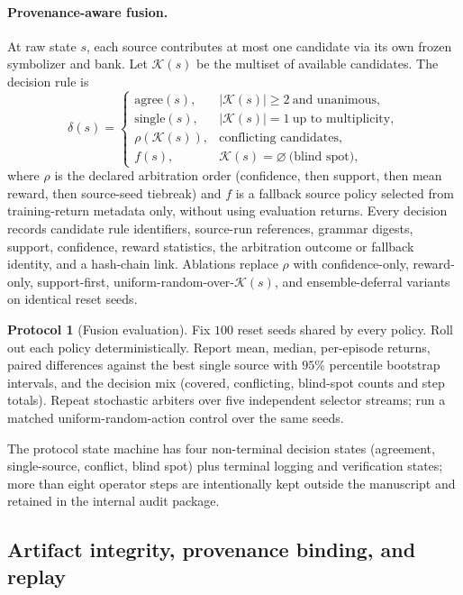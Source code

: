 \documentclass[11pt,a4paper]{article}
\theoremstyle{definition}
\newtheorem{protocol}{Protocol}[section]
\begin{document}
\paragraph{Provenance-aware fusion.}
At raw state $s$, each source contributes at most one candidate via its own
frozen symbolizer and bank. Let $\mathcal{K}(s)$ be the multiset of available
candidates. The decision rule is
\begin{equation}
\delta(s) =
\begin{cases}
\text{agree}(s), & |\mathcal{K}(s)| \ge 2\ \text{and unanimous},\\
\text{single}(s), & |\mathcal{K}(s)| = 1\ \text{up to multiplicity},\\
\rho(\mathcal{K}(s)), & \text{conflicting candidates},\\
f(s), & \mathcal{K}(s) = \varnothing\ \text{(blind spot)},
\end{cases}
\label{eq:fusion}
\end{equation}
where $\rho$ is the declared arbitration order
(confidence, then support, then mean reward, then source-seed tiebreak) and
$f$ is a fallback source policy selected from training-return metadata only,
without using evaluation returns. Every decision records candidate rule
identifiers, source-run references, grammar digests, support, confidence,
reward statistics, the arbitration outcome or fallback identity, and a
hash-chain link. Ablations replace $\rho$ with confidence-only,
reward-only, support-first, uniform-random-over-$\mathcal{K}(s)$, and
ensemble-deferral variants on identical reset seeds.

\begin{protocol}[Fusion evaluation]
Fix $100$ reset seeds shared by every policy. Roll out each policy
deterministically. Report mean, median, per-episode returns, paired
differences against the best single source with $95\%$ percentile bootstrap
intervals, and the decision mix (covered, conflicting, blind-spot counts and
step totals). Repeat stochastic arbiters over five independent selector
streams; run a matched uniform-random-action control over the same seeds.
\end{protocol}

The protocol state machine has four non-terminal decision states
(agreement, single-source, conflict, blind spot) plus terminal logging and
verification states; more than eight operator steps are intentionally kept
outside the manuscript and retained in the internal audit package.

\subsection{Artifact integrity, provenance binding, and replay}
\end{document}
